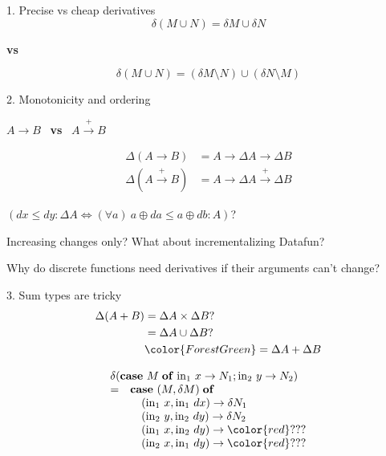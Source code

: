 \documentclass[dvipsnames]{beamer}
\newcommand\x\times
\newcommand\D\Delta
\newcommand\kw[1]{\ensuremath{\mathbf{#1}}}
\newcommand\fname[1]{\ensuremath{\mathrm{#1}}}
\begin{document}
\begin{frame}{1. Precise vs cheap derivatives}
  \Large\centering
  \[\delta(M \cup N) = \delta M \cup \delta N\]

  \textbf{vs}

  \[\delta(M \cup N) = (\delta M \setminus N) \cup (\delta N \setminus M)\]
\end{frame}

\newcommand\mto{\overset{+}{\to}}
\begin{frame}{2. Monotonicity and ordering}\Large
  {\centering
  $A \to B$ ~\textbf{vs}~ $A \mto B$

  \begin{align*}
    \D(A \to B) &= A \to \D A \to \D B\\
    \D(A \mto B) &= A \to \D A \mto \D B
  \end{align*}

  $(dx \le dy : \D A \iff (\forall a)~ a \oplus da \le a \oplus db : A)$?
  \par}

  \vspace{1em}\large
  Increasing changes only? What about incrementalizing Datafun?

  \vspace{1em}
  Why do discrete functions need derivatives if their arguments can't change?

\end{frame}

\begin{frame}{3. Sum types are tricky}
  \Large
  \begin{align*}
    \D(A + B) &= \D A \x \D B ?\\
    &= \D A \cup \D B ?\\
    &\color{ForestGreen} = \D A + \D B
  \end{align*}

  \[\begin{array}{ll}
    \multicolumn{2}{l}{\delta(\kw{case}~ M \mathrel{\kw{of}}
    \fname{in}_1~x \to N_1; \fname{in}_2~y \to N_2)}\\
    =& \kw{case}~ (M, \delta M) \mathrel{\kw{of}}\\
    & \quad(\fname{in}_1~x, \fname{in}_1~dx) \to \delta N_1\\
    & \quad(\fname{in}_2~y, \fname{in}_2~dy) \to \delta N_2\\
    & \quad(\fname{in}_1~x, \fname{in}_2~dy) \to {\color{red} ???}\\
    & \quad(\fname{in}_2~x, \fname{in}_1~dy) \to {\color{red} ???}
  \end{array}\]
\end{frame}
\end{document}
